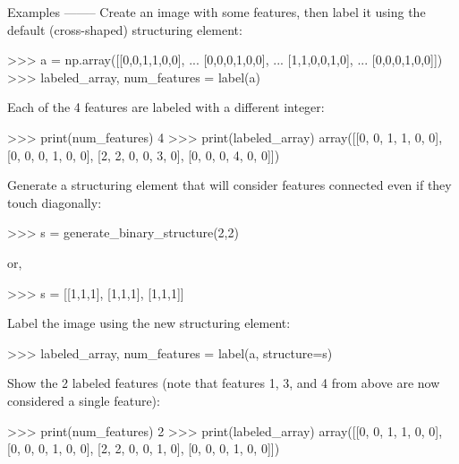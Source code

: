 \begin{DoxyVerb}
Examples
--------
Create an image with some features, then label it using the default
(cross-shaped) structuring element:

>>> a = np.array([[0,0,1,1,0,0],
...               [0,0,0,1,0,0],
...               [1,1,0,0,1,0],
...               [0,0,0,1,0,0]])
>>> labeled_array, num_features = label(a)

Each of the 4 features are labeled with a different integer:

>>> print(num_features)
4
>>> print(labeled_array)
array([[0, 0, 1, 1, 0, 0],
       [0, 0, 0, 1, 0, 0],
       [2, 2, 0, 0, 3, 0],
       [0, 0, 0, 4, 0, 0]])

Generate a structuring element that will consider features connected even
if they touch diagonally:

>>> s = generate_binary_structure(2,2)

or,

>>> s = [[1,1,1],
         [1,1,1],
         [1,1,1]]

Label the image using the new structuring element:

>>> labeled_array, num_features = label(a, structure=s)

Show the 2 labeled features (note that features 1, 3, and 4 from above are
now considered a single feature):

>>> print(num_features)
2
>>> print(labeled_array)
array([[0, 0, 1, 1, 0, 0],
       [0, 0, 0, 1, 0, 0],
       [2, 2, 0, 0, 1, 0],
       [0, 0, 0, 1, 0, 0]])\end{DoxyVerb}
 \hypertarget{namespacescipy_1_1ndimage_1_1measurements_aad766a883a0d5a42fe9ef21bbad19ac3}{}
